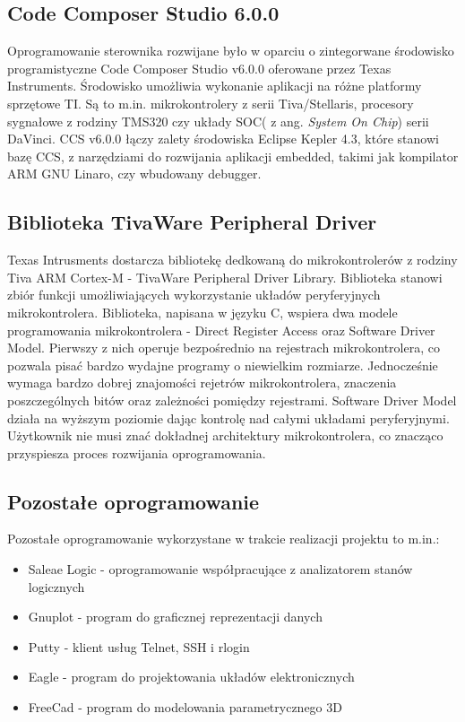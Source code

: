 \subsection{Code Composer Studio 6.0.0}

Oprogramowanie sterownika rozwijane było w oparciu o zintegorwane środowisko programistyczne Code Composer Studio v6.0.0 oferowane przez Texas Instruments. Środowisko umożliwia wykonanie aplikacji na różne platformy sprzętowe TI. Są to m.in. mikrokontrolery z serii Tiva/Stellaris, procesory sygnałowe z rodziny TMS320 czy układy SOC( z ang. {\em System On Chip}) serii DaVinci. CCS v6.0.0 łączy zalety środowiska Eclipse Kepler 4.3, które stanowi bazę CCS, z narzędziami do rozwijania aplikacji embedded, takimi jak kompilator ARM GNU Linaro, czy wbudowany debugger.
\subsection{Biblioteka TivaWare Peripheral Driver}
Texas Intrusments dostarcza bibliotekę dedkowaną do mikrokontrolerów z rodziny Tiva ARM Cortex-M - TivaWare  Peripheral Driver Library. Biblioteka stanowi zbiór funkcji umożliwiających wykorzystanie układów peryferyjnych mikrokontrolera. Biblioteka, napisana w języku C, wspiera dwa modele programowania mikrokontrolera - Direct Register Access oraz Software Driver Model. Pierwszy z nich operuje bezpośrednio na rejestrach mikrokontrolera, co pozwala pisać bardzo wydajne programy o niewielkim rozmiarze. Jednocześnie wymaga bardzo dobrej znajomości rejetrów mikrokontrolera, znaczenia poszczególnych bitów oraz zależności pomiędzy rejestrami. Software Driver Model działa na wyższym poziomie dając kontrolę nad całymi układami peryferyjnymi. Użytkownik nie musi znać dokładnej architektury mikrokontrolera, co znacząco przyspiesza proces rozwijania oprogramowania. 
\subsection{Pozostałe oprogramowanie}
Pozostałe oprogramowanie wykorzystane w trakcie realizacji projektu to m.in.:
\begin{itemize}
\item
Saleae Logic - oprogramowanie współpracujące z analizatorem stanów logicznych
\item
Gnuplot - program do graficznej reprezentacji danych
\item
Putty - klient usług Telnet, SSH i rlogin
\item
Eagle - program do projektowania układów elektronicznych
\item
FreeCad - program do modelowania parametrycznego 3D
\end{itemize}



